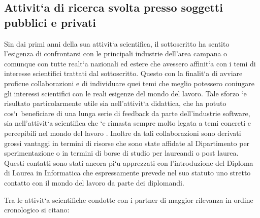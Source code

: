 \documentclass[11pt]{article}
\begin{document}
\subsection{Attivit\a`a di ricerca svolta presso soggetti pubblici e privati}

Sin dai primi anni della sua attivit\a`a scientifica, il sottoscritto
ha sentito l'esigenza di confrontarsi con le principali industrie
dell'area campana o comunque con tutte realt\a`a nazionali ed estere
che avessero affinit\a`a con i temi di interesse scientifici trattati
dal sottoscritto. Questo con la finalit\a`a di avviare proficue
collaborazioni e di individuare quei temi che meglio potessero
coniugare gli interessi scientifici con le reali esigenze del mondo
del lavoro. Tale sforzo \a`e risultato particolarmente utile sia
nell'attivit\a`a didattica, che ha potuto cos\a`\i\ beneficiare di una
lunga serie di feedback da parte dell'industrie software, sia
nell'attivit\a`a scientifica che \a`e rimasta sempre molto legata a
temi concreti e percepibili nel mondo del lavoro . Inoltre da tali
collaborazioni sono derivati grossi vantaggi in termini di risorse che
sono state affidate al Dipartimento per sperimentazione o in termini
di borse di studio per laureandi o post laurea. Questi contatti sono
stati ancora pi\a`u apprezzati con l'introduzione del Diploma di
Laurea in Informatica che espressamente prevede nel suo statuto uno
stretto contatto con il mondo del lavoro da parte dei diplomandi.

Tra le attivit\a`a scientifiche condotte con i partner di maggior
rilevanza in ordine cronologico si citano:
\end{document}
